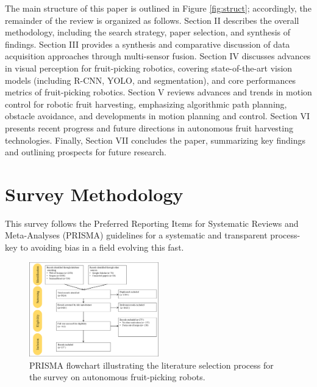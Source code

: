 \documentclass[a4paper,fleqn]{cas-dc}
\begin{document}
The main structure of this paper is outlined in Figure \ref{fig:struct}; accordingly, the remainder of the review is organized as follows. Section II describes the overall methodology, including the search strategy, paper selection, and synthesis of findings. Section III provides a synthesis and comparative discussion of data acquisition approaches through multi-sensor fusion.
Section IV discusses advances in visual perception for fruit-picking robotics, covering state-of-the-art vision models (including R-CNN, YOLO, and segmentation), and core performances metrics of fruit-picking robotics. Section V reviews advances and trends in motion control for robotic fruit harvesting, emphasizing algorithmic path planning, obstacle avoidance, and developments in motion planning and control. Section VI presents recent progress and future directions in autonomous fruit harvesting technologies. Finally, Section VII concludes the paper, summarizing key findings and outlining prospects for future research.



\section{Survey Methodology}
This survey follows the Preferred Reporting Items for Systematic Reviews and Meta-Analyses (PRISMA) guidelines \cite{page2021prisma} for a systematic and transparent process-key to avoiding bias in a field evolving this fast. 

\begin{figure}[h!]
    \centering
    \includegraphics[width=0.5\textwidth]{fig_prisma1.png}
    \caption{ PRISMA flowchart illustrating the literature selection process for the survey on autonomous fruit-picking robots. 
    }
    \label{fig:prisma1}
\end{figure}
\end{document}
